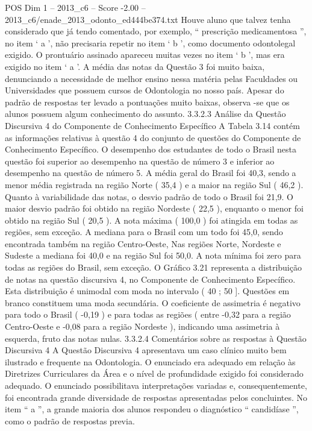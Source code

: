 \begin{textsample}{POS Dim 1 – 2013\_c6 – Score -2.00 – 2013\_c6/enade\_2013\_odonto\_ed444be374.txt}
Houve aluno que talvez tenha considerado que já tendo comentado, por exemplo, “ prescrição medicamentosa ”, no item ‘ a ’, não precisaria repetir no item ‘ b ’, como documento odontolegal exigido.
O prontuário assinado apareceu muitas vezes no item ‘ b ’, mas era exigido no item ‘ a ’.
A média das notas da Questão 3 foi muito baixa, denunciando a necessidade de melhor ensino nessa matéria pelas Faculdades ou Universidades que possuem cursos de Odontologia no nosso país.
Apesar do padrão de respostas ter levado a pontuações muito baixas, observa -se que os alunos possuem algum conhecimento do assunto. 3.3.2.3 Análise da Questão Discursiva 4 do Componente de Conhecimento Específico A Tabela 3.14 contém as informações relativas à questão 4 do conjunto de questões do Componente de Conhecimento Específico.
O desempenho dos estudantes de todo o Brasil nesta questão foi superior ao desempenho na questão de número 3 e inferior ao desempenho na questão de número 5.
A média geral do Brasil foi 40,3, sendo a menor média registrada na região Norte ( 35,4 ) e a maior na região Sul ( 46,2 ).
Quanto à variabilidade das notas, o desvio padrão de todo o Brasil foi 21,9.
O maior desvio padrão foi obtido na região Nordeste ( 22,5 ), enquanto o menor foi obtido na região Sul ( 20,5 ).
A nota máxima ( 100,0 ) foi atingida em todas as regiões, sem exceção.
A mediana para o Brasil com um todo foi 45,0, sendo encontrada também na região Centro-Oeste, Nas regiões Norte, Nordeste e Sudeste a mediana foi 40,0 e na região Sul foi 50,0.
A nota mínima foi zero para todas as regiões do Brasil, sem exceção.
O Gráfico 3.21 representa a distribuição de notas na questão discursiva 4, no Componente de Conhecimento Específico.
Esta distribuição é unimodal com moda no intervalo ( 40 ; 50 ].
Questões em branco constituem uma moda secundária.
O coeficiente de assimetria é negativo para todo o Brasil ( -0,19 ) e para todas as regiões ( entre -0,32 para a região Centro-Oeste e -0,08 para a região Nordeste ), indicando uma assimetria à esquerda, fruto das notas nulas. 3.3.2.4 Comentários sobre as respostas à Questão Discursiva 4 A Questão Discursiva 4 apresentava um caso clínico muito bem ilustrado e frequente na Odontologia.
O enunciado era adequado em relação às Diretrizes Curriculares da Área e o nível de profundidade exigido foi considerado adequado.
O enunciado possibilitava interpretações variadas e, consequentemente, foi encontrada grande diversidade de respostas apresentadas pelos concluintes.
No item “ a ”, a grande maioria dos alunos respondeu o diagnóstico “ candidíase ”, como o padrão de respostas previa.

\end{textsample}
